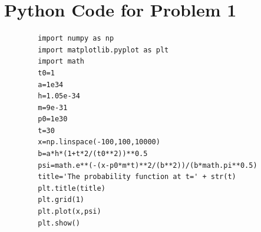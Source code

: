 \documentclass[a4paper]{article}
\begin{document}
\section*{Python Code for Problem 1}
    \begin{verbatim}
        import numpy as np
        import matplotlib.pyplot as plt
        import math
        t0=1
        a=1e34
        h=1.05e-34
        m=9e-31
        p0=1e30
        t=30
        x=np.linspace(-100,100,10000)
        b=a*h*(1+t*2/(t0**2))**0.5
        psi=math.e**(-(x-p0*m*t)**2/(b**2))/(b*math.pi**0.5)
        title='The probability function at t=' + str(t)
        plt.title(title)
        plt.grid(1)
        plt.plot(x,psi)
        plt.show()
    \end{verbatim}
\end{document}
